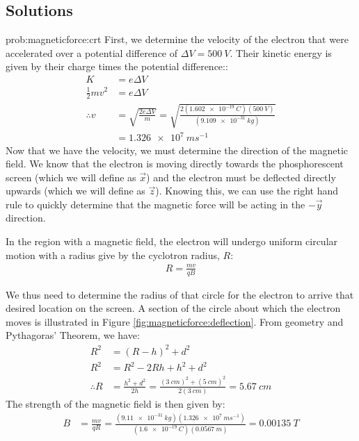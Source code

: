 \newpage
\subsection{Solutions}
\begin{solution}{prob:magneticforce:crt}\label{soln:magneticforce:crt}
First, we determine the velocity of the electron that were accelerated over a potential difference of $\Delta V=\SI{500}{V}$. Their kinetic energy is given by their charge times the potential difference::
\begin{align*}
K &= e\Delta V \\
\frac{1}{2} mv^2 &= e\Delta V\\
\therefore v &= \sqrt{\frac{2e\Delta V}{m}}= \sqrt{\frac{2(\SI{1.602e-19}{C})(\SI{500}{V})}{(\SI{9.109e-31}{kg})}}\\
 &= \SI{1.326e7}{ms^{-1}}
\end{align*}
Now that we have the velocity, we must determine the direction of the magnetic field. We know that the electron is moving directly towards the phosphorescent screen (which we will define as $\vec x$) and the electron must be deflected directly upwards (which we will define as $\vec z$). Knowing this, we can use the right hand rule to quickly determine that the magnetic force will be acting in the $-\vec y$ direction. 

In the region with a magnetic field, the electron will undergo uniform circular motion with a radius give by the cyclotron radius, $R$:
\begin{align*}
R=\frac{mv}{qB}
\end{align*}

We thus need to determine the radius of that circle for the electron to arrive that desired location on the screen. A section of the circle about which the electron moves is illustrated in Figure \ref{fig:magneticforce:deflection}.
From geometry and Pythagoras' Theorem, we have:
\begin{align*}
R^2 &= (R-h)^2+d^2\\
R^2 &= R^2-2Rh+h^2+d^2\\
\therefore R &= \frac{h^2+d^2}{2h}=\frac{(\SI{3}{cm})^2+(\SI{5}{cm})^2}{2(\SI{3}{cm})}=\SI{5.67}{cm}
\end{align*}
The strength of the magnetic field is then given by:
\begin{align*}
B&=\frac{mv}{qR}=\frac{(\SI{9.11e-31}{kg})(\SI{1.326e7}{ms^{-1}})}{(\SI{1.6e-19}{C})(\SI{0.0567}{m})}=\SI{0.00135}{T}
\end{align*}
\end{solution}


